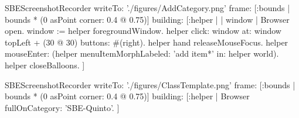 \documentclass[a4paper,10pt,twoside]{book}
\begin{document}
\begin{ExecuteSmalltalkScript}
SBEScreenshotRecorder writeTo: './figures/AddCategory.png' frame: [:bounds | bounds * (0 asPoint corner: 0.4 @ 0.75)] building: [:helper |
	| window |
	Browser open.
	window := helper foregroundWindow.
	helper click: window at: window topLeft + (30 @ 30) buttons: #(right).
	helper hand releaseMouseFocus.
	helper mouseEnter: (helper menuItemMorphLabeled: 'add item*' in: helper world).
	helper closeBalloons.
]
\end{ExecuteSmalltalkScript}
\begin{ExecuteSmalltalkScript}
SBEScreenshotRecorder writeTo: './figures/ClassTemplate.png' frame: [:bounds | bounds * (0 asPoint corner: 0.4 @ 0.75)] building: [:helper |
	Browser fullOnCategory: 'SBE-Quinto'.
]
\end{ExecuteSmalltalkScript}
\end{document}
